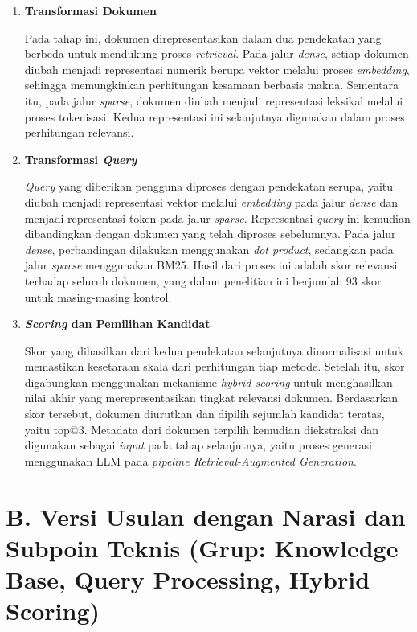 \documentclass[12pt,a4paper]{article}
\begin{document}
\begin{enumerate}[leftmargin=1.1cm]
\item \textbf{Transformasi Dokumen}

Pada tahap ini, dokumen direpresentasikan dalam dua pendekatan yang berbeda untuk mendukung proses \textit{retrieval}. Pada jalur \textit{dense}, setiap dokumen diubah menjadi representasi numerik berupa vektor melalui proses \textit{embedding}, sehingga memungkinkan perhitungan kesamaan berbasis makna. Sementara itu, pada jalur \textit{sparse}, dokumen diubah menjadi representasi leksikal melalui proses tokenisasi. Kedua representasi ini selanjutnya digunakan dalam proses perhitungan relevansi.

\item \textbf{Transformasi \textit{Query}}

\textit{Query} yang diberikan pengguna diproses dengan pendekatan serupa, yaitu diubah menjadi representasi vektor melalui \textit{embedding} pada jalur \textit{dense} dan menjadi representasi token pada jalur \textit{sparse}. Representasi \textit{query} ini kemudian dibandingkan dengan dokumen yang telah diproses sebelumnya. Pada jalur \textit{dense}, perbandingan dilakukan menggunakan \textit{dot product}, sedangkan pada jalur \textit{sparse} menggunakan BM25. Hasil dari proses ini adalah skor relevansi terhadap seluruh dokumen, yang dalam penelitian ini berjumlah 93 skor untuk masing-masing kontrol.

\item \textbf{\textit{Scoring} dan Pemilihan Kandidat}

Skor yang dihasilkan dari kedua pendekatan selanjutnya dinormalisasi untuk memastikan kesetaraan skala dari perhitungan tiap metode. Setelah itu, skor digabungkan menggunakan mekanisme \textit{hybrid scoring} untuk menghasilkan nilai akhir yang merepresentasikan tingkat relevansi dokumen. Berdasarkan skor tersebut, dokumen diurutkan dan dipilih sejumlah kandidat teratas, yaitu top@3. Metadata dari dokumen terpilih kemudian diekstraksi dan digunakan sebagai \textit{input} pada tahap selanjutnya, yaitu proses generasi menggunakan LLM pada \textit{pipeline Retrieval-Augmented Generation}.
\end{enumerate}

\section*{B. Versi Usulan dengan Narasi dan Subpoin Teknis (Grup: Knowledge Base, Query Processing, Hybrid Scoring)}
\end{document}
